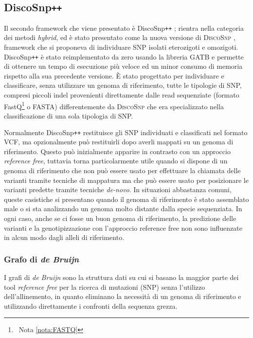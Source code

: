 \documentclass[../main.tex]{subfiles}
\begin{document}
\subsection{DiscoSnp\texttt{++}}
\label{discosnp++}

Il secondo framework che viene presentato è DiscoSnp\texttt{++} \cite{peterlongo2017discosnp++}; rientra nella categoria dei metodi \textit{hybrid}, ed è stato presentato come la nuova versione di \textsc{DiscoSnp} \cite{uricaru2015reference}, framework che si proponeva di individuare SNP isolati eterozigoti e omozigoti. DiscoSnp\texttt{++} è stato reimplementato da zero usando la libreria GATB \cite{drezen2014gatb} e permette di ottenere un tempo di esecuzione più veloce ed un minor consumo di memoria rispetto alla sua precedente versione. È stato progettato per individuare e classificare, senza utilizzare un genoma di riferimento, tutte le tipologie di SNP, compresi piccoli indel provenienti direttamente dalle read sequenziate (formato FastQ\footnote{\ Nota \vref{nota:FASTQ}} o FASTA) differentemente da \textsc{DiscoSnp} che era specializzato nella classificazione di una sola tipologia di SNP.

Normalmente DiscoSnp\texttt{++} restituisce gli SNP individuati e classificati nel formato VCF, ma opzionalmente può restituirli dopo averli mappati su un genoma di riferimento. Questo può inizialmente apparire in contrasto con un approccio \textit{reference free}, tuttavia torna particolarmente utile quando si dispone di un genoma di riferimento che non può essere usato per effettuare la chiamata delle varianti tramite tecniche di mappatura ma che può essere usato per posizionare le varianti predette tramite tecniche \textit{de-novo}. In situazioni abbastanza comuni, queste casistiche si presentano quando il genoma di riferimento è stato assemblato male o si sta analizzando un genoma molto distante dalla specie sequenziata. In ogni caso, anche se ci fosse un buon genoma di riferimento, la predizione delle varianti e la genotipizzazione con l'approccio reference free non sono influenzate in alcun modo dagli alleli di riferimento.

\subsubsection{Grafo di \textit{de Bruijn}}
\label{dBG}

I grafi di \textit{de Bruijn} sono la struttura dati su cui si basano la maggior parte dei tool \textit{reference free} per la  ricerca di mutazioni (SNP) senza l'utilizzo dell'allinemento, in quanto eliminano la necessità di un genoma di riferimento e utilizzando direttamente i confronti della sequenza grezza.
\end{document}
